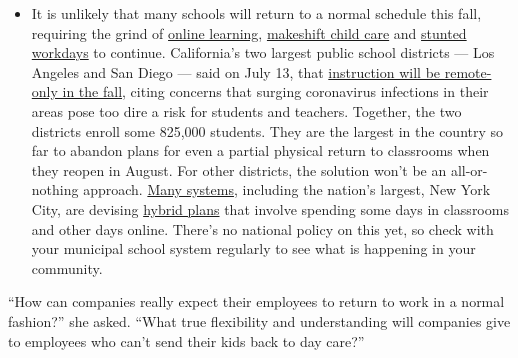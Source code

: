 \begin{itemize}
  \begin{itemize}
  \tightlist
  \item
    It is unlikely that many schools will return to a normal schedule
    this fall, requiring the grind of
    \href{https://www.nytimes.com/2020/06/05/us/coronavirus-education-lost-learning.html?action=click\&pgtype=Article\&state=default\&region=MAIN_CONTENT_3\&context=storylines_faq}{online
    learning},
    \href{https://www.nytimes.com/2020/05/29/us/coronavirus-child-care-centers.html?action=click\&pgtype=Article\&state=default\&region=MAIN_CONTENT_3\&context=storylines_faq}{makeshift
    child care} and
    \href{https://www.nytimes.com/2020/06/03/business/economy/coronavirus-working-women.html?action=click\&pgtype=Article\&state=default\&region=MAIN_CONTENT_3\&context=storylines_faq}{stunted
    workdays} to continue. California's two largest public school
    districts --- Los Angeles and San Diego --- said on July 13, that
    \href{https://www.nytimes.com/2020/07/13/us/lausd-san-diego-school-reopening.html?action=click\&pgtype=Article\&state=default\&region=MAIN_CONTENT_3\&context=storylines_faq}{instruction
    will be remote-only in the fall}, citing concerns that surging
    coronavirus infections in their areas pose too dire a risk for
    students and teachers. Together, the two districts enroll some
    825,000 students. They are the largest in the country so far to
    abandon plans for even a partial physical return to classrooms when
    they reopen in August. For other districts, the solution won't be an
    all-or-nothing approach.
    \href{https://bioethics.jhu.edu/research-and-outreach/projects/eschool-initiative/school-policy-tracker/}{Many
    systems}, including the nation's largest, New York City, are
    devising
    \href{https://www.nytimes.com/2020/06/26/us/coronavirus-schools-reopen-fall.html?action=click\&pgtype=Article\&state=default\&region=MAIN_CONTENT_3\&context=storylines_faq}{hybrid
    plans} that involve spending some days in classrooms and other days
    online. There's no national policy on this yet, so check with your
    municipal school system regularly to see what is happening in your
    community.
  \end{itemize}
\end{itemize}

``How can companies really expect their employees to return to work in a
normal fashion?'' she asked. ``What true flexibility and understanding
will companies give to employees who can't send their kids back to day
care?''


